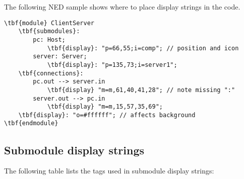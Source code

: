 The following NED sample shows where to place display strings in the code.

\begin{Verbatim}[commandchars=\\\{\}]
\tbf{module} ClientServer
    \tbf{submodules}:
        pc: Host;
            \tbf{display}: "p=66,55;i=comp"; // position and icon
        server: Server;
            \tbf{display}: "p=135,73;i=server1";
    \tbf{connections}:
        pc.out --> server.in
            \tbf{display} "m=m,61,40,41,28"; // note missing ":"
        server.out --> pc.in
            \tbf{display} "m=m,15,57,35,69";
    \tbf{display}: "o=#ffffff"; // affects background
\tbf{endmodule}
\end{Verbatim}


\subsection{Submodule display strings}


The following table lists the tags used in submodule display strings:


